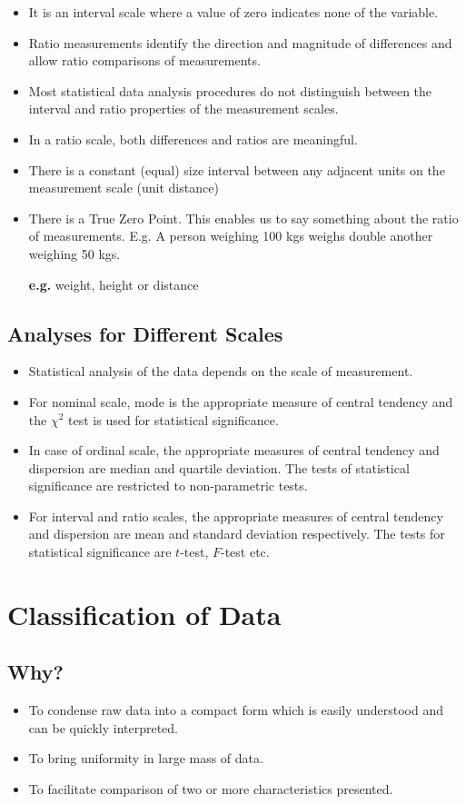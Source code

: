 \documentclass[
10pt, %
a4paper, %
]{report}
\begin{document}
\begin{description}
\begin{itemize}
\item It is an interval scale where a value of zero indicates none of the variable.
\item Ratio measurements identify the direction and magnitude of differences and allow ratio comparisons of measurements.
\item Most statistical data analysis procedures do not distinguish between the interval and ratio properties of the measurement scales.
\item In a ratio scale, both differences and ratios are meaningful.
\item There is a constant (equal) size interval between any adjacent units on the measurement scale (unit distance)
\item There is a True Zero Point. This enables us to say something about the ratio of measurements. E.g. A person weighing 100 kgs weighs double another weighing 50 kgs.
\item[\textbf{e.g.}] weight, height or distance
\end{itemize}
\end{description}

\subsection{Analyses for Different Scales}
\begin{itemize}
\item Statistical analysis of the data depends on the scale of measurement.
\item For nominal scale, mode is the appropriate measure of central tendency and the \(\chi^2\) test is used for statistical significance.
\item In case of ordinal scale, the appropriate measures of central tendency and dispersion are median and quartile deviation. The tests of statistical significance are restricted to non-parametric tests.
\item For interval and ratio scales, the appropriate measures of central tendency and dispersion are mean and standard deviation respectively. The tests for statistical significance are \(t\)-test, \(F\)-test etc.
\end{itemize}

\section{Classification of Data}

\subsection{Why?}
\begin{itemize}
\item To condense raw data into a compact form which is easily understood and can be quickly interpreted.
\item To bring uniformity in large mass of data.
\item To facilitate comparison of two or more characteristics presented.
\end{itemize}
\end{document}

